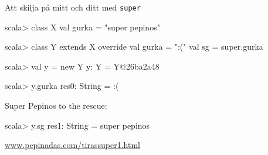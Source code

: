 \begin{Slide}{Att skilja på mitt och ditt med \texttt{super}}
\begin{REPL}
scala> class X { val gurka = "super pepinos" }

scala> class Y extends X {
         override val gurka = ":("
         val sg = super.gurka
       }

scala> val y = new Y
y: Y = Y@26ba2a48

scala> y.gurka
res0: String = :(
\end{REPL}

\pause
Super Pepinos to the rescue:
\begin{REPLnonum}
scala> y.sg
res1: String = super pepinos

\end{REPLnonum}


\pause
{}
\href{http://www.pepinadas.com/tirassuper1.html}{\small www.pepinadas.com/tirassuper1.html}
\end{Slide}






